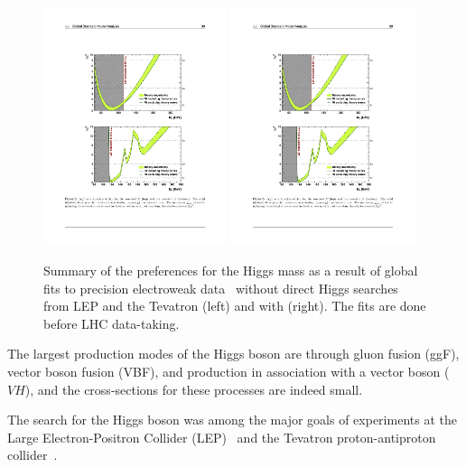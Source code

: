 \begin{figure}[tp]
  \centering
  \includegraphics[width=0.48\textwidth]{figures/standardmodel/gfitter_standardfit}
  \includegraphics[width=0.48\textwidth]{figures/standardmodel/gfitter_completefit}
  \caption{Summary of the preferences for the Higgs mass as a result of global fits to precision electroweak data~\cite{2009.gfitter} without direct Higgs searches from LEP and the Tevatron (left) and with (right). The fits are done before LHC data-taking.}
  \label{fig:sm-gfitter}
\end{figure}

The largest production modes of the Higgs boson are through gluon fusion (ggF), vector boson fusion (VBF), and production in association with a vector boson ($VH$), and the cross-sections for these processes are indeed small. 

The search for the Higgs boson was among the major goals of experiments at the Large Electron-Positron Collider (LEP)~\cite{2003.lep-higgs} and the Tevatron proton-antiproton collider~\cite{2013.tevatron-higgs}.

